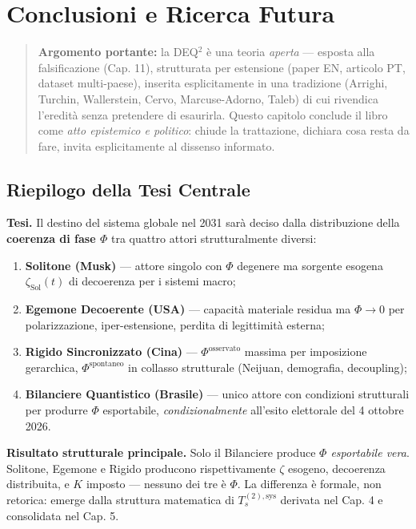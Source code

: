 \chapter{Conclusioni e Ricerca
Futura}\label{conclusioni-e-ricerca-futura}

\begin{quote}
\textbf{Argomento portante:} la DEQ$^2$ è una teoria \emph{aperta} ---
esposta alla falsificazione (Cap. 11), strutturata per estensione (paper
EN, articolo PT, dataset multi-paese), inserita esplicitamente in una
tradizione (Arrighi, Turchin, Wallerstein, Cervo, Marcuse-Adorno, Taleb)
di cui rivendica l'eredità senza pretendere di esaurirla. Questo
capitolo conclude il libro come \emph{atto epistemico e politico}:
chiude la trattazione, dichiara cosa resta da fare, invita
esplicitamente al dissenso informato.
\end{quote}



\section{Riepilogo della Tesi
Centrale}\label{riepilogo-della-tesi-centrale}

\Proved{} \textbf{Tesi.} Il destino del sistema globale nel 2031 sarà
deciso dalla distribuzione della \textbf{coerenza di fase \(\Phi\)} tra
quattro attori strutturalmente diversi:

\begin{enumerate}
\def\labelenumi{\arabic{enumi}.}
\tightlist
\item
  \textbf{Solitone (Musk)} --- attore singolo con \(\Phi\) degenere ma
  sorgente esogena \(\zeta_{\text{Sol}}(t)\) di decoerenza per i sistemi
  macro;
\item
  \textbf{Egemone Decoerente (USA)} --- capacità materiale residua ma
  \(\Phi \to 0\) per polarizzazione, iper-estensione, perdita di
  legittimità esterna;
\item
  \textbf{Rigido Sincronizzato (Cina)} --- \(\Phi^{\text{osservato}}\)
  massima per imposizione gerarchica, \(\Phi^{\text{spontaneo}}\) in
  collasso strutturale (Neijuan, demografia, decoupling);
\item
  \textbf{Bilanciere Quantistico (Brasile)} --- unico attore con
  condizioni strutturali per produrre \(\Phi\) esportabile,
  \emph{condizionalmente} all'esito elettorale del 4 ottobre 2026.
\end{enumerate}

\Hypoth{} \textbf{Risultato strutturale principale.} Solo il Bilanciere
produce \emph{\(\Phi\) esportabile vera}. Solitone, Egemone e Rigido
producono rispettivamente \(\zeta\) esogeno, decoerenza distribuita, e
\(K\) imposto --- nessuno dei tre è \(\Phi\). La differenza è formale,
non retorica: emerge dalla struttura matematica di
\(T_s^{(2),\text{sys}}\) derivata nel Cap. 4 e consolidata nel Cap. 5.



